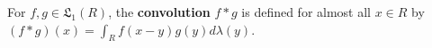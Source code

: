 For $f, g \in \mathfrak{L}_1(R)$, the \textbf{convolution} $f * g$ is defined for almost all $x \in R$ by $(f * g)(x) = \int_R f(x - y) g(y) d\lambda(y)$.
